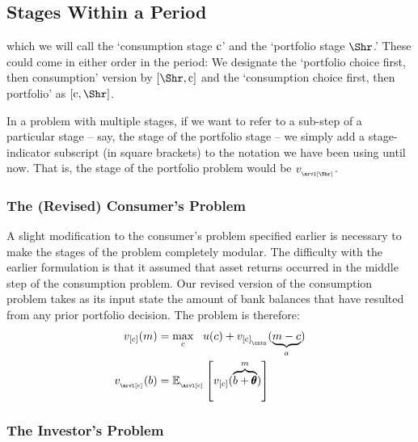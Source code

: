 \documentclass[titlepage, headings=optiontotocandhead]{Resources/texmf-local/tex/latex/econtex}
\begin{document}
\hypertarget{stages-within-a-period}{}
\subsection{{Stage}s Within a {Period}}\label{subsec:stageswithin}

which we will call the `consumption {stage} $\mathrm{c}$' and the `portfolio {stage} $\Shr$.'  These could come in either order in the {period}: We designate the `portfolio choice first, then consumption' version by $[\Shr,\cFunc]$ and the `consumption choice first, then portfolio' as $[\cFunc,\Shr]$.

In a problem with multiple {stages}, if we want to refer to a sub-{step} of a particular {stage} -- say, the {\Arrival} {stage} of the portfolio {stage} -- we simply add a {stage}-indicator subscript (in square brackets) to the notation we have been using until now.  That is, the {\Arrival} {stage} of the portfolio problem would be $v_{_\arvl[\Shr]}$.

\hypertarget{revised-consumers-problem}{}
\subsubsection{The (Revised) Consumer's Problem}\label{subsubsec:revised-consumers-problem}

A slight modification to the consumer's problem specified earlier is necessary to make the {stage}s of the problem completely modular.  The difficulty with the earlier formulation is that it assumed that asset returns occurred in the middle {step} of the consumption problem.  Our revised version of the consumption problem takes as its input state the amount of bank balances that have resulted from any prior portfolio decision.  The problem is therefore:
  \begin{equation}\begin{gathered}\begin{aligned}
 v_{[\cFunc]}(m) & =  \max_{c} ~~ u(c)+  v_{[\cFunc]_{_\cntn}}(\underbrace{m-c}_{a})             
\\    v_{_\arvl[\cFunc]}(b) & = \Ex_{_\arvl[\cFunc]}\left[v_{[c]}(\overbrace{b+\TranShkEmp}^{m})\right] \label{eq:vBalances}
      \end{aligned}\end{gathered}\end{equation}


\hypertarget{subsubsec:investors-problem}{}
\subsubsection{The Investor's Problem}\label{subsubsec:investors-problem}
\end{document}
